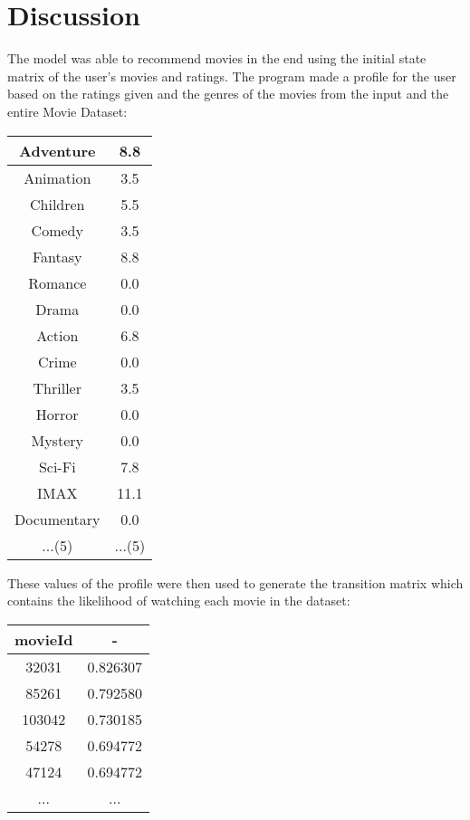 \documentclass{article}
\begin{document}
\section{Discussion}
The model was able to recommend movies in the end using the initial state matrix of the user's movies and ratings. The program made a profile for the user
based on the ratings given and the genres of the movies from the input and the entire Movie Dataset: \\
\begin{center}
    \begin{tabular}{||c c||}
        \hline
        Adventure & 8.8 \\ [0.5ex] 
        \hline
        Animation & 3.5 \\ 
        \hline
        Children & 5.5 \\ 
        \hline
        Comedy & 3.5 \\ 
        \hline
        Fantasy & 8.8 \\ 
        \hline
        Romance & 0.0 \\ 
        \hline
        Drama & 0.0 \\ 
        \hline
        Action & 6.8 \\ 
        \hline
        Crime & 0.0 \\ 
        \hline
        Thriller & 3.5 \\ 
        \hline
        Horror & 0.0 \\ 
        \hline
        Mystery & 0.0 \\ 
        \hline
        Sci-Fi & 7.8 \\ 
        \hline
        IMAX & 11.1 \\ 
        \hline
        Documentary & 0.0 \\ 
        \hline
        ...(5) & ...(5) \\ [1ex]
        \hline
    \end{tabular}
    \end{center}

These values of the profile were then used to generate the transition matrix which contains the likelihood of watching each movie in the dataset: \\
\begin{center}
    \begin{tabular}{||c c||}
        \hline
        movieId & - \\ [0.5ex] 
        \hline
        32031 & 0.826307 \\ 
        \hline
        85261 & 0.792580 \\ 
        \hline
        103042 & 0.730185 \\ 
        \hline
        54278 & 0.694772 \\ 
        \hline
        47124 & 0.694772 \\ 
        \hline
        ... & ... \\ [1ex]
        \hline
    \end{tabular}
    \end{center}
\end{document}

